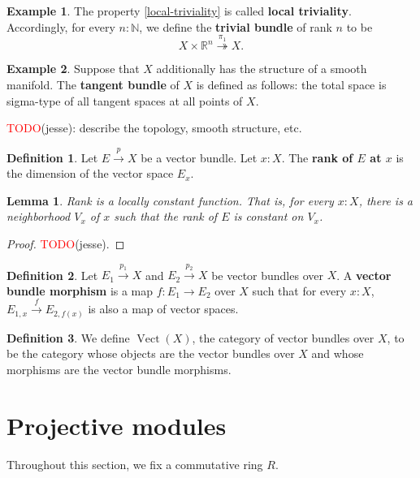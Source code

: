 \documentclass[11pt]{article}
\newcommand{\R}{\mathbb{R}}
\newcommand{\remph}[1]{\textcolor{red}{#1}}
\newcommand{\TODO}{\remph{TODO}}
\newcommand{\Vect}{\operatorname{Vect}}
\theoremstyle{plain}
\newtheorem{lemma}{Lemma}[section]
\theoremstyle{definition}
\newtheorem{definition}{Definition}[section]
\newtheorem{example}{Example}[section]
\newcommand{\N}{\mathbb{N}}
\begin{document}
\begin{example}\label{example-trivial-bundle}
  The property \ref{local-triviality} is called \textbf{local triviality}. Accordingly, for every \(n : \N\), we define the \textbf{trivial bundle} of rank \(n\) to be
  \[
    X \times \R^n \overset{\pi_1}{\twoheadrightarrow} X.
  \]
\end{example}

\begin{example}\label{example-tangent-bundle}
  Suppose that \(X\) additionally has the structure of a smooth manifold. The \textbf{tangent bundle} of \(X\) is defined as follows: the total space is sigma-type of all tangent spaces at all points of \(X\).

  \TODO(jesse): describe the topology, smooth structure, etc.
\end{example}

\begin{definition}\label{def-rank}
  Let \(E \overset{p}{\to} X\) be a vector bundle. Let \(x : X\). The \textbf{rank of \(E\) at \(x\)} is the dimension of the vector space \(E_x\).
\end{definition}

\begin{lemma}\label{lemma-rank-locally-constant}
  Rank is a locally constant function. That is, for every \(x : X\), there is a neighborhood \(V_{x}\) of \(x\) such that the rank of \(E\) is constant on \(V_x\).
\end{lemma}

\begin{proof}
  \TODO(jesse).
\end{proof}

\begin{definition} \label{def-vector-bundle-homomorphism}
  Let \(E_1 \overset{p_1}{\to} X\) and \(E_2 \overset{p_2}{\to} X\) be vector bundles over \(X\).
  A \textbf{vector bundle morphism} is a map \(f : E_1 \to E_2\) over \(X\) such that for every \(x : X\), \(E_{1,x} \overset{f}{\to} E_{2,f(x)}\) is also a map of vector spaces.
\end{definition}

\begin{definition} \label{def-category-vector-bundles}
  We define \(\Vect(X)\), the category of vector bundles over \(X\), to be the category whose objects are the vector bundles over \(X\) and whose morphisms are the vector bundle morphisms.
\end{definition}

\section{Projective modules}
Throughout this section, we fix a commutative ring \(R\).
\end{document}
